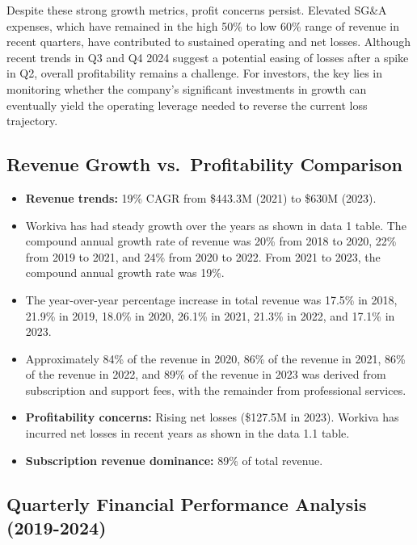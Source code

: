 \documentclass[
  10pt,
  a4paper,
]{article}
\providecommand{\tightlist}{%
  \setlength{\itemsep}{0pt}\setlength{\parskip}{0pt}}\usepackage{longtable,booktabs,array}
\begin{document}
Despite these strong growth metrics, profit concerns persist. Elevated
SG\&A expenses, which have remained in the high 50\% to low 60\% range
of revenue in recent quarters, have contributed to sustained operating
and net losses. Although recent trends in Q3 and Q4 2024 suggest a
potential easing of losses after a spike in Q2, overall profitability
remains a challenge. For investors, the key lies in monitoring whether
the company's significant investments in growth can eventually yield the
operating leverage needed to reverse the current loss trajectory.

\subsection{Revenue Growth vs.~Profitability
Comparison}\label{revenue-growth-vs.-profitability-comparison}

\begin{itemize}
\tightlist
\item
  \textbf{Revenue trends:} 19\% CAGR from \$443.3M (2021) to \$630M
  (2023).
\item
  Workiva has had steady growth over the years as shown in data 1 table.
  The compound annual growth rate of revenue was 20\% from 2018 to 2020,
  22\% from 2019 to 2021, and 24\% from 2020 to 2022. From 2021 to 2023,
  the compound annual growth rate was 19\%.
\item
  The year-over-year percentage increase in total revenue was 17.5\% in
  2018, 21.9\% in 2019, 18.0\% in 2020, 26.1\% in 2021, 21.3\% in 2022,
  and 17.1\% in 2023.
\item
  Approximately 84\% of the revenue in 2020, 86\% of the revenue in
  2021, 86\% of the revenue in 2022, and 89\% of the revenue in 2023 was
  derived from subscription and support fees, with the remainder from
  professional services.
\item
  \textbf{Profitability concerns:} Rising net losses (\$127.5M in 2023).
  Workiva has incurred net losses in recent years as shown in the data
  1.1 table.
\item
  \textbf{Subscription revenue dominance:} 89\% of total revenue.
\end{itemize}

\subsection{Quarterly Financial Performance Analysis
(2019-2024)}\label{quarterly-financial-performance-analysis-2019-2024}
\end{document}

